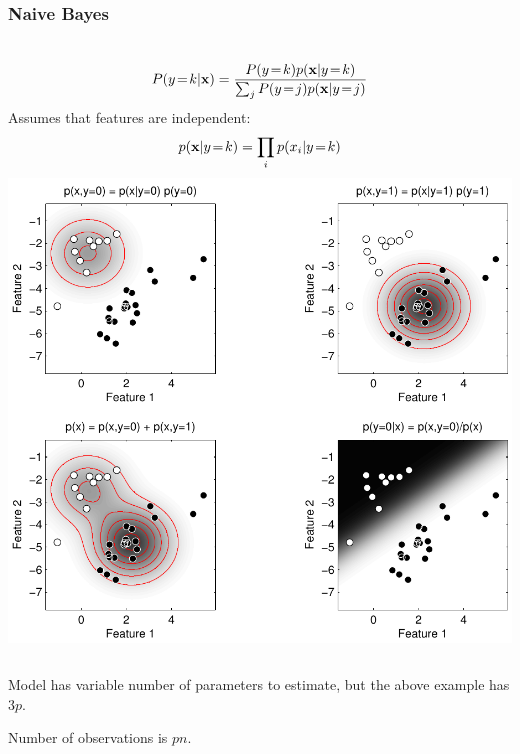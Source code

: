 \begin{frame}
\frametitle{Naive Bayes}
\begin{columns}[c]
\begin{align*}
P(y\!=\!k|{\bf x}) = \frac{P(y\!=\!k) p({\bf x}|y\!=\!k)}{\sum_j P(y\!=\!j) p({\bf x}|y\!=\!j)}\cr
\end{align*}
Assumes that features are independent:
\begin{align*}
p({\bf x}|y\!=\!k) = \prod_i p(x_i|y\!=\!k)
\end{align*}
\includegraphics[width=\textwidth]{simple_naive_bayes}
\end{columns}
Model has variable number of parameters to estimate, but the above example has $3p$.\par
Number of observations is $pn$.
\end{frame}

